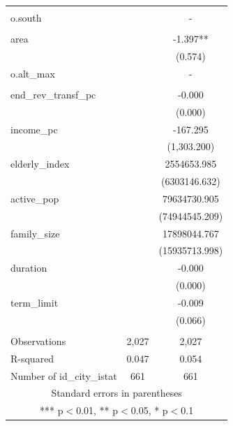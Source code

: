 \documentclass[]{article}
\begin{document}
\begin{tabular}{lcc}
 &  &  \\
o.south &  & - \\
 &  &  \\
area &  & -1.397** \\
 &  & (0.574) \\
o.alt\_max &  & - \\
 &  &  \\
end\_rev\_transf\_pc &  & -0.000 \\
 &  & (0.000) \\
income\_pc &  & -167.295 \\
 &  & (1,303.200) \\
elderly\_index &  & 2554653.985 \\
 &  & (6303146.632) \\
active\_pop &  & 79634730.905 \\
 &  & (74944545.209) \\
family\_size &  & 17898044.767 \\
 &  & (15935713.998) \\
duration &  & -0.000 \\
 &  & (0.000) \\
term\_limit &  & -0.009 \\
 &  & (0.066) \\
 &  &  \\
Observations & 2,027 & 2,027 \\
R-squared & 0.047 & 0.054 \\
 Number of id\_city\_istat & 661 & 661 \\ \hline
\multicolumn{3}{c}{ Standard errors in parentheses} \\
\multicolumn{3}{c}{ *** p$<$0.01, ** p$<$0.05, * p$<$0.1} \\
\end{tabular}
\end{document}
